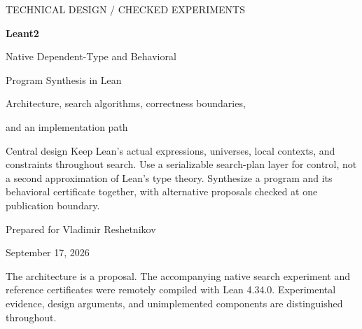 \documentclass[11pt,letterpaper,oneside]{article}
\begin{document}
\begin{titlepage}
\vspace*{18mm}
{\sffamily\large\color{Olive} TECHNICAL DESIGN / CHECKED EXPERIMENTS\par}
\vspace{12mm}
{\Huge\bfseries\color{Ink} Leant2\par}
\vspace{6mm}
{\LARGE Native Dependent-Type and Behavioral\par Program Synthesis in Lean\par}
\vspace{12mm}
{\large Architecture, search algorithms, correctness boundaries,\par and an implementation path\par}
\vspace{15mm}
\begin{decision}{Central design}
Keep Lean's actual expressions, universes, local contexts, and constraints throughout search. Use a serializable search-plan layer for control, not a second approximation of Lean's type theory. Synthesize a program and its behavioral certificate together, with alternative proposals checked at one publication boundary.
\end{decision}
\vfill
{\large Prepared for Vladimir Reshetnikov\par}
\vspace{3mm}
{\large September 17, 2026\par}
\vspace{7mm}
{\small The architecture is a proposal. The accompanying native search experiment and reference certificates were remotely compiled with Lean 4.34.0. Experimental evidence, design arguments, and unimplemented components are distinguished throughout.}
\end{titlepage}

\clearpage
\tableofcontents
\clearpage
{}






\appendix


\end{document}
